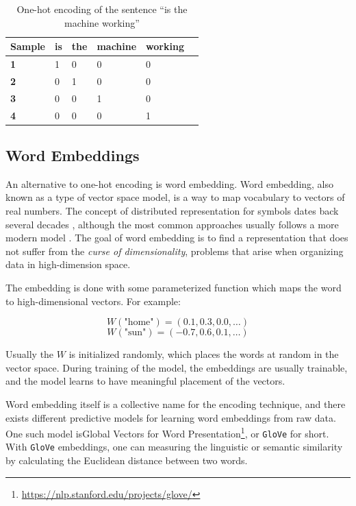 \begin{table}[H]
    \centering
    \begin{tabular}{|l|l|l|l|l|l|}
        \hline
        \textbf{Sample} & \textbf{is} & \textbf{the} & \textbf{machine} & \textbf{working} \\ \hline
        \textbf{1}      & 1           & 0            & 0                & 0                \\ \hline
        \textbf{2}      & 0           & 1            & 0                & 0                \\ \hline
        \textbf{3}      & 0           & 0            & 1                & 0                \\ \hline
        \textbf{4}      & 0           & 0            & 0                & 1                \\ \hline
    \end{tabular}
    \caption{One-hot encoding of the sentence ``is the machine working''}
    \label{table:one_hot_encoding}
\end{table}

\subsection{Word Embeddings}
An alternative to one-hot encoding is word embedding. Word embedding, also known as a type of vector space model, is a way to map vocabulary to vectors of real numbers. The concept of distributed representation for symbols dates back several decades \citep{hinton1986learning}, although the most common approaches usually follows a more modern model \citep{bengio2003neural}. The goal of word embedding is to find a representation that does not suffer from the \emph{curse of dimensionality}, problems that arise when organizing data in high-dimension space. 

The embedding is done with some parameterized function which maps the word to high-dimensional vectors. For example:

\begin{equation*}
    W(\text{"home"}) = (0.1, 0.3, 0.0, \ldots)
\end{equation*}
\begin{equation*}
    W(\text{"sun"}) = (-0.7, 0.6, 0.1, \ldots)
\end{equation*}

Usually the \(W\) is initialized randomly, which places the words at random in the vector space. During training of the model, the embeddings are usually trainable, and the model learns to have meaningful placement of the vectors.

Word embedding itself is a collective name for the encoding technique, and there exists different predictive models for learning word embeddings from raw data. One such model isGlobal Vectors for Word Presentation\footnote{\url{https://nlp.stanford.edu/projects/glove/}}, or {\tt GloVe} for short. With {\tt GloVe} embeddings, one can measuring the linguistic or semantic similarity by calculating the Euclidean distance between two words.